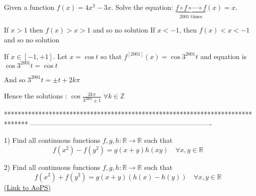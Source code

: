 \begin{solution}
	\begin{tcolorbox}Given a function $f(x)=4x^3-3x$. Solve the equation: $ \underbrace{f{\circ}f{\circ}\cdots{\circ}f}_{2001\textrm{ times}}(x)=x $.\end{tcolorbox}
If $x>1$ then $f(x)>x>1$ and so no solution
If $x<-1$, then $f(x)<x<-1$ and so no solution

If $x\in[-1,+1]$. Let $x=\cos t$ so that $f^{[2001]}(x)=\cos 3^{2001}t$ and equation is $\cos 3^{2001}t=\cos t$

And so $3^{2001}t=\pm t+2k\pi$

Hence the solutions : $\boxed{\cos\frac{2k\pi}{3^{2001}\pm 1}}$ $\forall k\in\mathbb Z$
\end{solution}
*******************************************************************************
-------------------------------------------------------------------------------

\begin{problem}
	1) Find all continuous functions $f,g,h:\mathbb{R}\to\mathbb{R}$ such that
\[f(x^2)-f(y^2)=g(x+y)h(xy) \quad \forall x,y\in\mathbb{R}\]

2) Find all continuous functions $f,g,h:\mathbb{R}\to\mathbb{R}$ such that
\[f(x^2)+f(y^2)=g(x+y)\left (h(x)-h(y)  \right ) \quad \forall x,y\in\mathbb{R}\]
	\flushright \href{https://artofproblemsolving.com/community/c6h564189}{(Link to AoPS)}
\end{problem}




